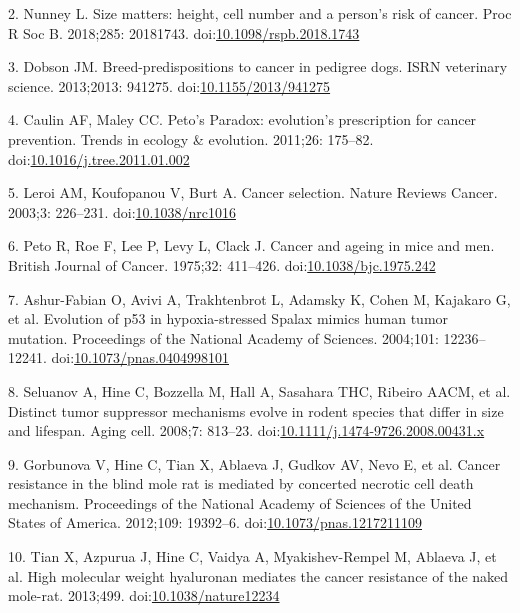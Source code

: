 \documentclass[10pt,letterpaper]{article}
\begin{document}
\leavevmode\hypertarget{ref-Nunney:20181c2}{}%
2. Nunney L. Size matters: height, cell number and a person's risk of
cancer. Proc R Soc B. 2018;285: 20181743.
doi:\href{https://doi.org/10.1098/rspb.2018.1743}{10.1098/rspb.2018.1743}

\leavevmode\hypertarget{ref-Dobson2013}{}%
3. Dobson JM. Breed-predispositions to cancer in pedigree dogs. ISRN
veterinary science. 2013;2013: 941275.
doi:\href{https://doi.org/10.1155/2013/941275}{10.1155/2013/941275}

\leavevmode\hypertarget{ref-CaulinAndMaley2011}{}%
4. Caulin AF, Maley CC. Peto's Paradox: evolution's prescription for
cancer prevention. Trends in ecology \& evolution. 2011;26: 175--82.
doi:\href{https://doi.org/10.1016/j.tree.2011.01.002}{10.1016/j.tree.2011.01.002}

\leavevmode\hypertarget{ref-Leroi2003}{}%
5. Leroi AM, Koufopanou V, Burt A. Cancer selection. Nature Reviews
Cancer. 2003;3: 226--231.
doi:\href{https://doi.org/10.1038/nrc1016}{10.1038/nrc1016}

\leavevmode\hypertarget{ref-Peto1975}{}%
6. Peto R, Roe F, Lee P, Levy L, Clack J. Cancer and ageing in mice and
men. British Journal of Cancer. 1975;32: 411--426.
doi:\href{https://doi.org/10.1038/bjc.1975.242}{10.1038/bjc.1975.242}

\leavevmode\hypertarget{ref-Ashur-Fabian2004}{}%
7. Ashur-Fabian O, Avivi A, Trakhtenbrot L, Adamsky K, Cohen M, Kajakaro
G, et al. Evolution of p53 in hypoxia-stressed Spalax mimics human tumor
mutation. Proceedings of the National Academy of Sciences. 2004;101:
12236--12241.
doi:\href{https://doi.org/10.1073/pnas.0404998101}{10.1073/pnas.0404998101}

\leavevmode\hypertarget{ref-Seluanov2008}{}%
8. Seluanov A, Hine C, Bozzella M, Hall A, Sasahara THC, Ribeiro AACM,
et al. Distinct tumor suppressor mechanisms evolve in rodent species
that differ in size and lifespan. Aging cell. 2008;7: 813--23.
doi:\href{https://doi.org/10.1111/j.1474-9726.2008.00431.x}{10.1111/j.1474-9726.2008.00431.x}

\leavevmode\hypertarget{ref-Gorbunova2012}{}%
9. Gorbunova V, Hine C, Tian X, Ablaeva J, Gudkov AV, Nevo E, et al.
Cancer resistance in the blind mole rat is mediated by concerted
necrotic cell death mechanism. Proceedings of the National Academy of
Sciences of the United States of America. 2012;109: 19392--6.
doi:\href{https://doi.org/10.1073/pnas.1217211109}{10.1073/pnas.1217211109}

\leavevmode\hypertarget{ref-Tian2013}{}%
10. Tian X, Azpurua J, Hine C, Vaidya A, Myakishev-Rempel M, Ablaeva J,
et al. High molecular weight hyaluronan mediates the cancer resistance
of the naked mole-rat. 2013;499.
doi:\href{https://doi.org/10.1038/nature12234}{10.1038/nature12234}
\end{document}
